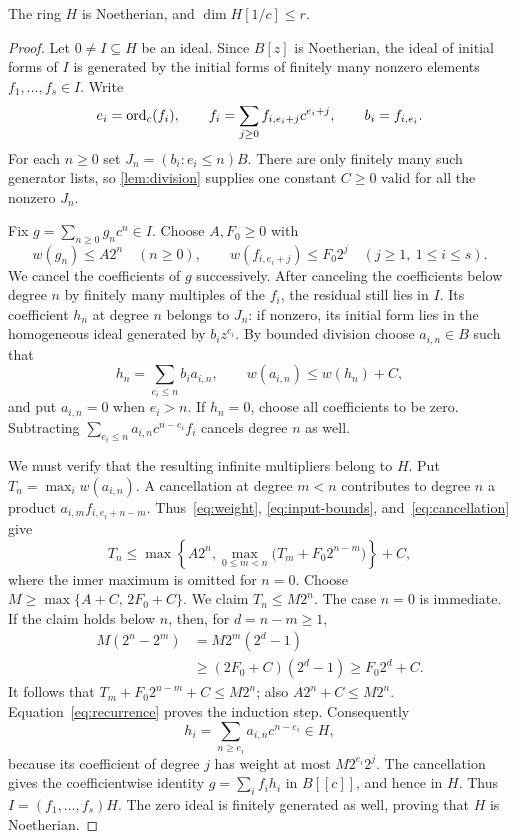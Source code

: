 \begin{proposition}\label{prop:noetherian}
The ring $H$ is Noetherian, and $\dim H[1/c]\le r$.
\end{proposition}

\begin{proof}
Let $0\ne I\subseteq H$ be an ideal. Since $B[z]$ is Noetherian,
the ideal of initial forms of $I$ is generated by the initial forms
of finitely many nonzero elements $f_1,\ldots,f_s\in I$. Write
\[
 e_i=\operatorname{ord}_c(f_i),\qquad
 f_i=\sum_{j\ge0}f_{i,e_i+j}c^{e_i+j},\qquad b_i=f_{i,e_i}.
\]
For each $n\ge0$ set $J_n=(b_i:e_i\le n)B$.
There are only finitely many such generator lists, so
\cref{lem:division} supplies one constant $C\ge0$ valid for
all the nonzero $J_n$.

Fix $g=\sum_{n\ge0}g_nc^n\in I$. Choose $A,F_0\ge0$ with
\begin{equation}\label{eq:input-bounds}
 w(g_n)\le A2^n\quad(n\ge0),\qquad
 w(f_{i,e_i+j})\le F_0 2^j\quad(j\ge1,\ 1\le i\le s).
\end{equation}
We cancel the coefficients of $g$ successively. After canceling
the coefficients below degree $n$ by finitely many multiples of
the $f_i$, the residual still lies in $I$. Its coefficient $h_n$
at degree $n$ belongs to $J_n$: if nonzero, its initial form lies
in the homogeneous ideal generated by $b_i z^{e_i}$.
By bounded division choose $a_{i,n}\in B$ such that
\begin{equation}\label{eq:cancellation}
 h_n=\sum_{e_i\le n}b_i a_{i,n},\qquad
 w(a_{i,n})\le w(h_n)+C,
\end{equation}
and put $a_{i,n}=0$ when $e_i>n$.
If $h_n=0$, choose all coefficients to be zero.
Subtracting $\sum_{e_i\le n}a_{i,n}c^{n-e_i}f_i$ cancels
degree $n$ as well.

We must verify that the resulting infinite multipliers belong to
$H$. Put $T_n=\max_i w(a_{i,n})$. A cancellation at degree
$m<n$ contributes to degree $n$ a product
$a_{i,m}f_{i,e_i+n-m}$. Thus~\eqref{eq:weight},
\eqref{eq:input-bounds}, and~\eqref{eq:cancellation} give
\begin{equation}\label{eq:recurrence}
 T_n\le\max\left\{A2^n,
       \max_{0\le m<n}\bigl(T_m+F_0 2^{n-m}\bigr)\right\}+C,
\end{equation}
where the inner maximum is omitted for $n=0$.
Choose $M\ge\max\{A+C,\,2F_0+C\}$.
We claim $T_n\le M2^n$. The case $n=0$ is immediate.
If the claim holds below $n$, then, for $d=n-m\ge1$,
\begin{align*}
 M(2^n-2^m)
 &=M2^m(2^d-1)\\
 &\ge(2F_0+C)(2^d-1)\ge F_0 2^d+C.
\end{align*}
It follows that $T_m+F_0 2^{n-m}+C\le M2^n$; also
$A2^n+C\le M2^n$. Equation~\eqref{eq:recurrence} proves
the induction step. Consequently
\[
 h_i=\sum_{n\ge e_i}a_{i,n}c^{n-e_i}\in H,
\]
because its coefficient of degree $j$ has weight at most
$M2^{e_i}2^j$. The cancellation gives the coefficientwise identity
$g=\sum_i f_i h_i$ in $B[[c]]$, and hence in $H$.
Thus $I=(f_1,\ldots,f_s)H$. The zero ideal is finitely generated
as well, proving that $H$ is Noetherian.


\end{proof}
